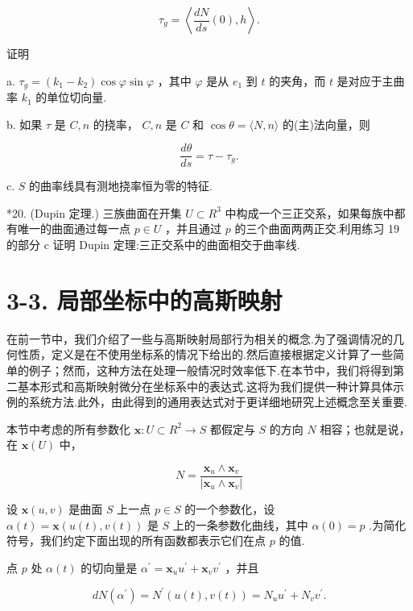 \[
{\tau }_{g} = \left\langle  {\frac{dN}{ds}\left( 0\right) ,h}\right\rangle  .
\]

证明

a. \({\tau }_{g} = \left( {{k}_{1} - {k}_{2}}\right) \cos \varphi \sin \varphi\) ，其中 \(\varphi\) 是从 \({e}_{1}\) 到 \(t\) 的夹角，而 \(t\) 是对应于主曲率 \({k}_{1}\) 的单位切向量.

b. 如果 \(\tau\) 是 \(C,n\) 的挠率， \(C,n\) 是 \(C\) 和 \(\cos \theta  = \langle N,n\rangle\) 的(主)法向量，则

\[
\frac{d\theta }{ds} = \tau  - {\tau }_{g}.
\]

c. \(S\) 的曲率线具有测地挠率恒为零的特征.

*20. (Dupin 定理.) 三族曲面在开集 \(U \subset  {R}^{3}\) 中构成一个三正交系，如果每族中都有唯一的曲面通过每一点 \(p \in  U\) ，并且通过 \(p\) 的三个曲面两两正交.利用练习 19 的部分 \(\mathrm{c}\) 证明 Dupin 定理:三正交系中的曲面相交于曲率线.

\section*{3-3. 局部坐标中的高斯映射}

在前一节中，我们介绍了一些与高斯映射局部行为相关的概念.为了强调情况的几何性质，定义是在不使用坐标系的情况下给出的.然后直接根据定义计算了一些简单的例子；然而，这种方法在处理一般情况时效率低下.在本节中，我们将得到第二基本形式和高斯映射微分在坐标系中的表达式.这将为我们提供一种计算具体示例的系统方法.此外，由此得到的通用表达式对于更详细地研究上述概念至关重要.

本节中考虑的所有参数化 \(\mathbf{x} : U \subset  {R}^{2} \rightarrow  S\) 都假定与 \(S\) 的方向 \(N\) 相容；也就是说，在 \(\mathbf{x}\left( U\right)\) 中，

\[
N = \frac{{\mathbf{x}}_{u} \land  {\mathbf{x}}_{v}}{\left| {\mathbf{x}}_{u} \land  {\mathbf{x}}_{v}\right| }
\]

设 \(\mathbf{x}\left( {u,v}\right)\) 是曲面 \(S\) 上一点 \(p \in  S\) 的一个参数化，设 \(\alpha \left( t\right)  = \mathbf{x}\left( {u\left( t\right) ,v\left( t\right) }\right)\) 是 \(S\) 上的一条参数化曲线，其中 \(\alpha \left( 0\right)  = p\) .为简化符号，我们约定下面出现的所有函数都表示它们在点 \(p\) 的值.

点 \(p\) 处 \(\alpha \left( t\right)\) 的切向量是 \({\alpha }^{\prime } = {\mathbf{x}}_{u}{u}^{\prime } + {\mathbf{x}}_{v}{v}^{\prime }\) ，并且

\[
{dN}\left( {\alpha }^{\prime }\right)  = {N}^{\prime }\left( {u\left( t\right) ,v\left( t\right) }\right)  = {N}_{u}{u}^{\prime } + {N}_{v}{v}^{\prime }.
\]

